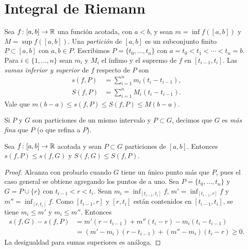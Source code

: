 \section{Integral de Riemann}

Sea \(f\colon [a, b] \to \mathbb{R}\) una función acotada, con \(a < b\), y sean \(m = \inf f([a, b])\) y \(M = \sup f([a, b])\). Una \emph{partición} de \([a, b]\) es un subconjunto finito \(P \subset [a, b]\) con \(a, b \in P\). Escribimos \(P = \{ t_0, \dots, t_n \}\) con \(a = t_0 < t_1 < \cdots < t_n = b\). Para \(i \in \{1, \dots, n\}\) sean \(m_i\) y \(M_i\) el ínfimo y el supremo de \(f\) en \([t_{i-1}, t_i]\). Las \emph{sumas inferior y superior} de \(f\) respecto de \(P\) son
\begin{align*}
  s(f, P) & = \sum_{i=1}^{n} m_i (t_i - t_{i-1}), \\
  S(f, P) & = \sum_{i=1}^{n} M_i (t_i - t_{i-1}).
\end{align*}
Vale que \(m(b - a) \leq s(f, P) \leq S(f, P) \leq M(b - a)\).

\begin{definition}[Refinamiento]
  Si \(P\) y \(G\) son particiones de un mismo intervalo y \(P \subset G\), decimos que \(G\) es \emph{más fina} que \(P\) (o que refina a \(P\)).
\end{definition}

\begin{lemma}
  Sea \(f\colon [a, b] \to \mathbb{R}\) acotada y sean \(P \subset G\) particiones de \([a, b]\). Entonces \(s(f, P) \leq s(f, G)\) y \(S(f, G) \leq S(f, P)\).
\end{lemma}

\begin{proof}
  Alcanza con probarlo cuando \(G\) tiene un único punto más que \(P\), pues el caso general se obtiene agregando los puntos de a uno. Sea \(P = \{ t_0, \dots, t_n \}\) y \(G = P \cup \{ r \}\) con \(t_{i-1} < r < t_i\). Sean \(m_i = \inf_{[t_{i-1}, t_i]} f\), \(m' = \inf_{[t_{i-1}, r]} f\) y \(m'' = \inf_{[r, t_i]} f\). Como \([t_{i-1}, r]\) y \([r, t_i]\) están contenidos en \([t_{i-1}, t_i]\), se tiene \(m_i \leq m'\) y \(m_i \leq m''\). Entonces
  \begin{align*}
    s(f, G) - s(f, P) & = m'(r - t_{i-1}) + m''(t_i - r) - m_i (t_i - t_{i-1})       \\
                      & = (m' - m_i)(r - t_{i-1}) + (m'' - m_i)(t_i - r) \geq 0.
  \end{align*}
  La desigualdad para sumas superiores es análoga.
\end{proof}

